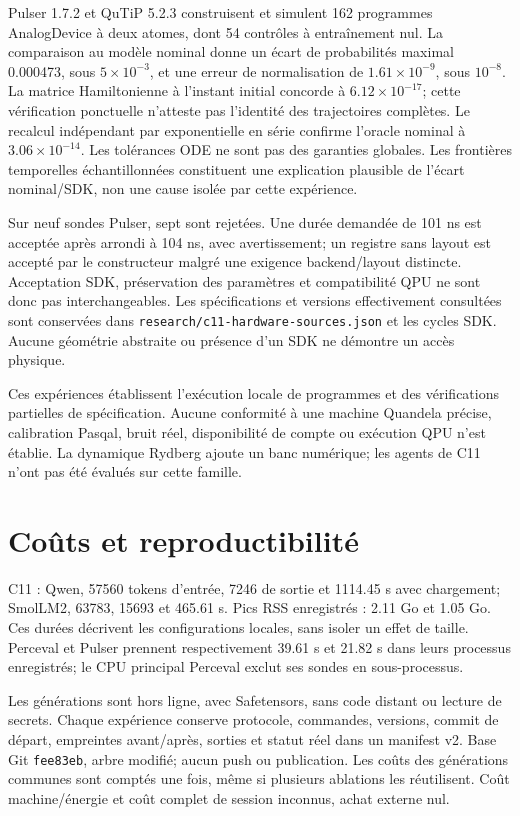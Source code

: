 \documentclass[11pt]{article}
\begin{document}
Pulser 1.7.2 et QuTiP 5.2.3 construisent et simulent 162 programmes AnalogDevice à deux atomes, dont 54 contrôles à entraînement nul. La comparaison au modèle nominal donne un écart de probabilités maximal 0.000473, sous $5\times10^{-3}$, et une erreur de normalisation de $1.61\times10^{-9}$, sous $10^{-8}$. La matrice Hamiltonienne à l'instant initial concorde à $6.12\times10^{-17}$; cette vérification ponctuelle n'atteste pas l'identité des trajectoires complètes. Le recalcul indépendant par exponentielle en série confirme l'oracle nominal à $3.06\times10^{-14}$. Les tolérances ODE ne sont pas des garanties globales. Les frontières temporelles échantillonnées constituent une explication plausible de l'écart nominal/SDK, non une cause isolée par cette expérience.

Sur neuf sondes Pulser, sept sont rejetées. Une durée demandée de 101 ns est acceptée après arrondi à 104 ns, avec avertissement; un registre sans layout est accepté par le constructeur malgré une exigence backend/layout distincte. Acceptation SDK, préservation des paramètres et compatibilité QPU ne sont donc pas interchangeables. Les spécifications et versions effectivement consultées sont conservées dans \texttt{research/c11-hardware-sources.json} et les cycles SDK. Aucune géométrie abstraite ou présence d'un SDK ne démontre un accès physique.

Ces expériences établissent l'exécution locale de programmes et des vérifications partielles de spécification. Aucune conformité à une machine Quandela précise, calibration Pasqal, bruit réel, disponibilité de compte ou exécution QPU n'est établie. La dynamique Rydberg ajoute un banc numérique; les agents de C11 n'ont pas été évalués sur cette famille.

\section{Coûts et reproductibilité}

C11 : Qwen, 57560 tokens d’entrée, 7246 de sortie et 1114.45 s avec chargement; SmolLM2, 63783, 15693 et 465.61 s. Pics RSS enregistrés : 2.11 Go et 1.05 Go. Ces durées décrivent les configurations locales, sans isoler un effet de taille. Perceval et Pulser prennent respectivement 39.61 s et 21.82 s dans leurs processus enregistrés; le CPU principal Perceval exclut ses sondes en sous-processus.

Les générations sont hors ligne, avec Safetensors, sans code distant ou lecture de secrets. Chaque expérience conserve protocole, commandes, versions, commit de départ, empreintes avant/après, sorties et statut réel dans un manifest v2. Base Git \texttt{fee83eb}, arbre modifié; aucun push ou publication. Les coûts des générations communes sont comptés une fois, même si plusieurs ablations les réutilisent. Coût machine/énergie et coût complet de session inconnus, achat externe nul.
\end{document}
